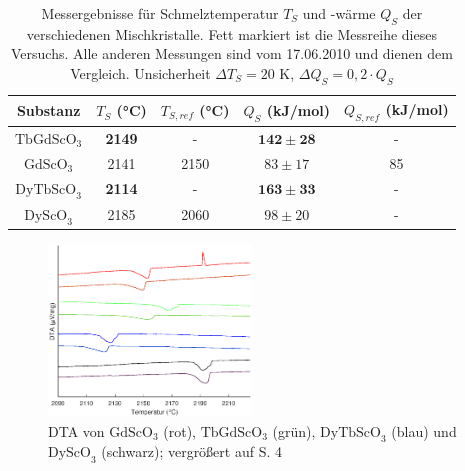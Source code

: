 \documentclass[aps,twocolumn,secnumarabic,nobalancelastpage,amsmath,amssymb,
nofootinbib,superscriptaddress]{revtex4-1}
\begin{document}
\begin{table}[h]
\begin{ruledtabular}
\begin{tabular}{ccccc}
 Substanz & $T_S$ (°C) & $T_{S,ref}$ (°C) & $Q_S$ (kJ/mol) & $Q_{S,ref}$ (kJ/mol)\\
\hline
  \textbf{$\text{TbGdScO}_3$}  & \textbf{2149} & -      & $\mathbf{142\pm 28}$  & -  \\
  $\text{GdScO}_3$    & 2141 & 2150 \cite{paperK}       & $83\pm 17$   & 85 \\
  \textbf{$\text{DyTbScO}_3$}  & \textbf{2114} & -      & $\mathbf{163\pm 33}$  & -  \\
  $\text{DyScO}_3$    & 2185 & 2060 \cite{meltpDyScO3}  & $98\pm 20$   & - \\
\end{tabular}
\end{ruledtabular}
\caption{\label{tab:erg} Messergebnisse für Schmelztemperatur $T_S$ und -wärme $Q_S$ der verschiedenen Mischkristalle. Fett markiert ist die Messreihe dieses Versuchs.
Alle anderen Messungen sind vom 17.06.2010 und dienen dem Vergleich. Unsicherheit $\Delta T_S=20\text{ K}$, $\Delta Q_S=0,2\cdot Q_S$ }
\end{table}

\begin{figure}[h]
  \centering
   \includegraphics[width=0.48\textwidth]{../img/vglSkandate.eps}
  \caption{\label{fig:dtaAll} DTA von $\text{GdScO}_3$ (rot), $\text{TbGdScO}_3$ (grün), $\text{DyTbScO}_3$ (blau) und $\text{DyScO}_3$ (schwarz); vergrößert auf S. 4}
\end{figure}
\end{document}
